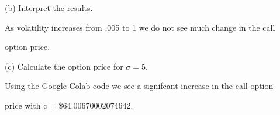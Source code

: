\documentclass{article}
\begin{document}
(b) Interpret the results.

\vspace{\baselineskip}


As volatility increases from .005 to 1 we do not see much change in the call 

option price.

\vspace{\baselineskip}

(c) Calculate the option price for \( \sigma = 5 \).

\vspace{\baselineskip}

Using the Google Colab code we see a signifcant increase in the call option 

price with c = \$64.00670002074642.
\end{document}
